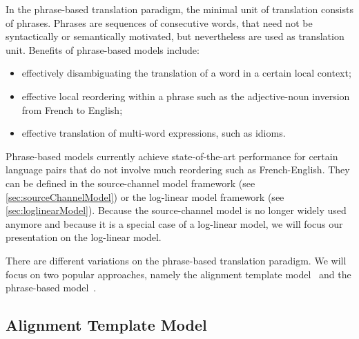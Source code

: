 In the phrase-based translation paradigm, the minimal unit of translation consists
of phrases. Phrases are sequences of consecutive words, that need not be syntactically
or semantically motivated, but nevertheless are used as translation unit.
Benefits of phrase-based models include:
%
\begin{itemize}
  \item effectively disambiguating the translation of a word in a certain local context;
  \item effective local reordering within a phrase such as the adjective-noun inversion from French to English;
  \item effective translation of multi-word expressions, such as idioms.
\end{itemize}
%
Phrase-based models
currently achieve state-of-the-art performance for
certain language pairs that do not involve much reordering
such as French-English. They can be defined
in the source-channel model framework (see \autoref{sec:sourceChannelModel}) or
the log-linear model framework (see \autoref{sec:loglinearModel}).
Because the source-channel model is no longer widely used anymore and because it is
a special case of a log-linear model, we will focus our presentation
on the log-linear model.

There are different variations on the phrase-based translation paradigm.
We will focus on two popular approaches, namely the alignment template
model~\citep{och-tillmann-ney:1999:EMNLP,och-ney:2004:CL} and the phrase-based
model~\citep{koehn-och-marcu:2003:NAACL,koehn:2010:book}.

\subsection{Alignment Template Model}

